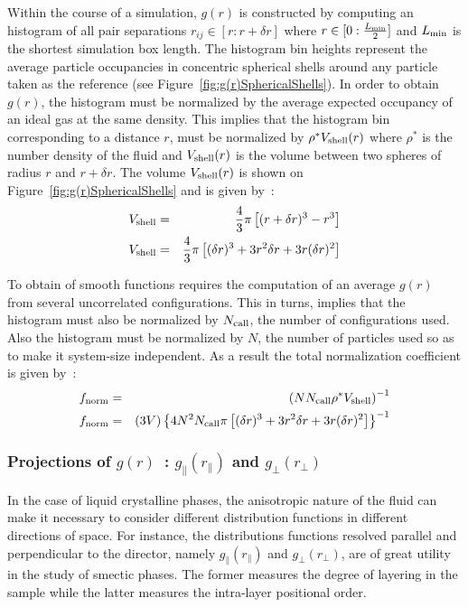 Within the course of a simulation, $g(r)$ is constructed by computing an histogram of all pair
separations $r_{ij}\in[r: r+\delta r]$ where $r \in [0:\frac{L_{\mathrm{min}}}{2}]$ and 
$L_{\mathrm{min}}$ is the shortest simulation box length. The histogram bin heights represent 
the average particle occupancies in concentric spherical shells around any particle taken as 
the reference (see Figure~\ref{fig:g(r)SphericalShells}). In order to obtain $g(r)$, the 
histogram must be normalized  by the average expected occupancy of an ideal gas at 
the same density. This implies that the histogram bin corresponding to a distance $r$, must 
be normalized by $\rho^{*}V_{\mathrm{shell}}(r)$  where $\rho^{*}$ is the number density of 
the fluid and $V_{\mathrm{shell}}(r)$ is the volume between two spheres of radius $r$ and $r+\delta
r$. The volume $V_{\mathrm{shell}}(r)$ is shown on Figure~\ref{fig:g(r)SphericalShells} 
and is given by~:
%
\begin{eqnarray}
	V_{\mathrm{shell}} &=& \frac{4}{3}\pi\left[ (r+\delta r)^3 - r^3 \right]	\nonumber \\
	V_{\mathrm{shell}} &=& \frac{4}{3}\pi\left[ (\delta r)^3 + 3r^2\delta r + 3r(\delta r)^2\right]
\end{eqnarray}

To obtain of smooth functions requires the computation of an average $g(r)$ from several
uncorrelated configurations. This in turns, implies that the histogram must also be normalized by
$N_{\mathrm{call}}$, the number of configurations used. Also the histogram must be normalized by $N$,
the number of particles used so as to make it system-size independent. As a result the 
total normalization coefficient is given by~:
\begin{eqnarray}
	f_{\mathrm{norm}} &=& \left( N N_{\mathrm{call}}\rho^{*} V_{\mathrm{shell}} \right)^{-1}	\nonumber \\
	f_{\mathrm{norm}} &=& (3V)
	\left\{ 4N^2N_{\mathrm{call}}\pi\left[ (\delta r)^3 + 3r^2\delta r + 3r(\delta
	r)^2\right] \right\}^{-1}
\end{eqnarray}


\subsubsection{Projections of $g(r)$~: $g_\parallel(r_\parallel)$ and $g_\perp(r_\perp)$}

In the case of liquid crystalline phases, the anisotropic nature of the fluid can make it
necessary to consider 
different distribution functions in different directions of space. For instance, the 
distributions functions resolved parallel and perpendicular to the director, namely 
$g_\parallel(r_\parallel)$ and $g_\perp(r_\perp)$, are of great utility in the study of 
smectic phases. The former measures the degree of layering in the sample while the latter
measures the intra-layer positional order.\\

